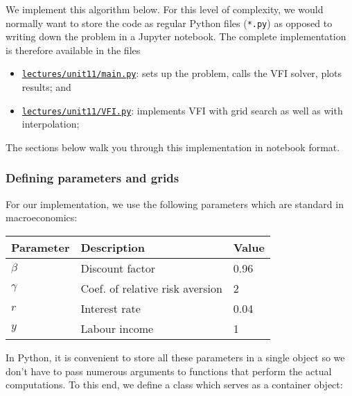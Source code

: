 \documentclass{scrartcl}
\providecommand{\tightlist}{%
      \setlength{\itemsep}{0pt}\setlength{\parskip}{0pt}}
\begin{document}
We implement this algorithm below. For this level of complexity, we
would normally want to store the code as regular Python files
(\texttt{*.py}) as opposed to writing down the problem in a Jupyter
notebook. The complete implementation is therefore available in the
files

\begin{itemize}
\tightlist
\item
  \href{../lectures/unit11/main.py}{\texttt{lectures/unit11/main.py}}:
  sets up the problem, calls the VFI solver, plots results; and
\item
  \href{../lectures/unit11/VFI.py}{\texttt{lectures/unit11/VFI.py}}:
  implements VFI with grid search as well as with interpolation;
\end{itemize}

The sections below walk you through this implementation in notebook
format.

    \hypertarget{defining-parameters-and-grids}{%
\subsubsection*{Defining parameters and
grids}\label{defining-parameters-and-grids}}

For our implementation, we use the following parameters which are
standard in macroeconomics:

\begin{longtable}[]{@{}lll@{}}
\toprule
Parameter & Description & Value\tabularnewline
\midrule
\endhead
\(\beta\) & Discount factor & 0.96\tabularnewline
\(\gamma\) & Coef. of relative risk aversion & 2\tabularnewline
\(r\) & Interest rate & 0.04\tabularnewline
\(y\) & Labour income & 1\tabularnewline
\bottomrule
\end{longtable}

In Python, it is convenient to store all these parameters in a single
object so we don't have to pass numerous arguments to functions that
perform the actual computations. To this end, we define a class which
serves as a container object:
\end{document}
